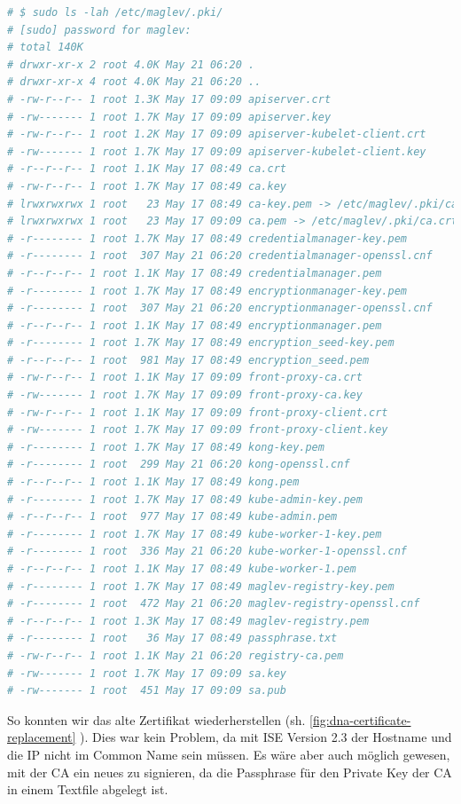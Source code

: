\begin{lstlisting}[language=bash]
# $ sudo ls -lah /etc/maglev/.pki/
# [sudo] password for maglev: 
# total 140K
# drwxr-xr-x 2 root 4.0K May 21 06:20 .
# drwxr-xr-x 4 root 4.0K May 21 06:20 ..
# -rw-r--r-- 1 root 1.3K May 17 09:09 apiserver.crt
# -rw------- 1 root 1.7K May 17 09:09 apiserver.key
# -rw-r--r-- 1 root 1.2K May 17 09:09 apiserver-kubelet-client.crt
# -rw------- 1 root 1.7K May 17 09:09 apiserver-kubelet-client.key
# -r--r--r-- 1 root 1.1K May 17 08:49 ca.crt
# -rw-r--r-- 1 root 1.7K May 17 08:49 ca.key
# lrwxrwxrwx 1 root   23 May 17 08:49 ca-key.pem -> /etc/maglev/.pki/ca.crt
# lrwxrwxrwx 1 root   23 May 17 09:09 ca.pem -> /etc/maglev/.pki/ca.crt
# -r-------- 1 root 1.7K May 17 08:49 credentialmanager-key.pem
# -r-------- 1 root  307 May 21 06:20 credentialmanager-openssl.cnf
# -r--r--r-- 1 root 1.1K May 17 08:49 credentialmanager.pem
# -r-------- 1 root 1.7K May 17 08:49 encryptionmanager-key.pem
# -r-------- 1 root  307 May 21 06:20 encryptionmanager-openssl.cnf
# -r--r--r-- 1 root 1.1K May 17 08:49 encryptionmanager.pem
# -r-------- 1 root 1.7K May 17 08:49 encryption_seed-key.pem
# -r--r--r-- 1 root  981 May 17 08:49 encryption_seed.pem
# -rw-r--r-- 1 root 1.1K May 17 09:09 front-proxy-ca.crt
# -rw------- 1 root 1.7K May 17 09:09 front-proxy-ca.key
# -rw-r--r-- 1 root 1.1K May 17 09:09 front-proxy-client.crt
# -rw------- 1 root 1.7K May 17 09:09 front-proxy-client.key
# -r-------- 1 root 1.7K May 17 08:49 kong-key.pem
# -r-------- 1 root  299 May 21 06:20 kong-openssl.cnf
# -r--r--r-- 1 root 1.1K May 17 08:49 kong.pem
# -r-------- 1 root 1.7K May 17 08:49 kube-admin-key.pem
# -r--r--r-- 1 root  977 May 17 08:49 kube-admin.pem
# -r-------- 1 root 1.7K May 17 08:49 kube-worker-1-key.pem
# -r-------- 1 root  336 May 21 06:20 kube-worker-1-openssl.cnf
# -r--r--r-- 1 root 1.1K May 17 08:49 kube-worker-1.pem
# -r-------- 1 root 1.7K May 17 08:49 maglev-registry-key.pem
# -r-------- 1 root  472 May 21 06:20 maglev-registry-openssl.cnf
# -r--r--r-- 1 root 1.3K May 17 08:49 maglev-registry.pem
# -r-------- 1 root   36 May 17 08:49 passphrase.txt
# -rw-r--r-- 1 root 1.1K May 21 06:20 registry-ca.pem
# -rw------- 1 root 1.7K May 17 09:09 sa.key
# -rw------- 1 root  451 May 17 09:09 sa.pub
\end{lstlisting}

So konnten wir das alte Zertifikat wiederherstellen (sh. \ref{fig:dna-certificate-replacement} ). Dies war kein Problem, da mit ISE Version 2.3 der Hostname und die IP nicht im Common Name sein müssen. Es wäre aber auch möglich gewesen, mit der CA ein neues zu signieren, da die Passphrase für den Private Key der CA in einem Textfile abgelegt ist.\\

